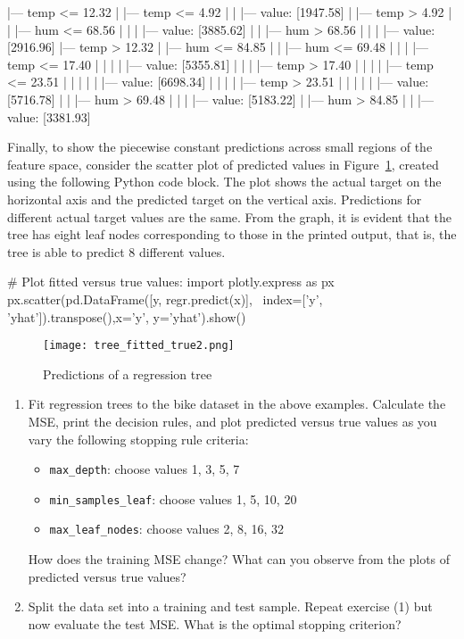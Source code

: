 \begin{textcode}
|--- temp <= 12.32
|   |--- temp <= 4.92
|   |   |--- value: [1947.58]
|   |--- temp >  4.92
|   |   |--- hum <= 68.56
|   |   |   |--- value: [3885.62]
|   |   |--- hum >  68.56
|   |   |   |--- value: [2916.96]
|--- temp >  12.32
|   |--- hum <= 84.85
|   |   |--- hum <= 69.48
|   |   |   |--- temp <= 17.40
|   |   |   |   |--- value: [5355.81]
|   |   |   |--- temp >  17.40
|   |   |   |   |--- temp <= 23.51
|   |   |   |   |   |--- value: [6698.34]
|   |   |   |   |--- temp >  23.51
|   |   |   |   |   |--- value: [5716.78]
|   |   |--- hum >  69.48
|   |   |   |--- value: [5183.22]
|   |--- hum >  84.85
|   |   |--- value: [3381.93]
\end{textcode}

Finally, to show the piecewise constant predictions across small regions of the feature space, consider the scatter plot of predicted values in Figure~\ref{fig:treescatter}, created using the following Python code block. The plot shows the actual target on the horizontal axis and the predicted target on the vertical axis. Predictions for different actual target values are the same. From the graph, it is evident that the tree has eight leaf nodes corresponding to those in the printed output, that is, the tree is able to predict 8 different values. 

\begin{pythoncode}
# Plot fitted versus true values:
import plotly.express as px
px.scatter(pd.DataFrame([y, regr.predict(x)], \
    index=['y', 'yhat']).transpose(),x='y', y='yhat').show()
\end{pythoncode}

\begin{figure}
\centering
\texttt{[image: tree\_fitted\_true2.png]}
\caption{Predictions of a regression tree}
\label{fig:treescatter}
\end{figure}

\begin{exercisebox}

\begin{enumerate}
\item Fit regression trees to the bike dataset in the above examples. Calculate the MSE, print the decision rules, and plot predicted versus true values as you vary the following stopping rule criteria:
\begin{itemize}
   \item \texttt{max\_depth}: choose values 1, 3, 5, 7
   \item \texttt{min\_samples\_leaf}: choose values 1, 5, 10, 20
   \item \texttt{max\_leaf\_nodes}: choose values 2, 8, 16, 32
\end{itemize}
How does the training MSE change? What can you observe from the plots of predicted versus true values?

\item Split the data set into a training and test sample. Repeat exercise (1) but now evaluate the test MSE. What is the optimal stopping criterion?
\end{enumerate}
\end{exercisebox}

